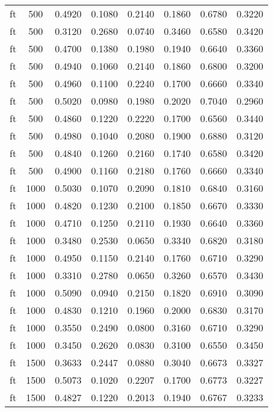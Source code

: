 \begin{scriptsize}
\begin{longtable}{cccccccc}
		ft       & 500  & 0.4920 & 0.1080 & 0.2140 & 0.1860 & 0.6780 & 0.3220 \\
		ft       & 500  & 0.3120 & 0.2680 & 0.0740 & 0.3460 & 0.6580 & 0.3420 \\
		ft       & 500  & 0.4700 & 0.1380 & 0.1980 & 0.1940 & 0.6640 & 0.3360 \\
		ft       & 500  & 0.4940 & 0.1060 & 0.2140 & 0.1860 & 0.6800 & 0.3200 \\
		ft       & 500  & 0.4960 & 0.1100 & 0.2240 & 0.1700 & 0.6660 & 0.3340 \\
		ft       & 500  & 0.5020 & 0.0980 & 0.1980 & 0.2020 & 0.7040 & 0.2960 \\
		ft       & 500  & 0.4860 & 0.1220 & 0.2220 & 0.1700 & 0.6560 & 0.3440 \\
		ft       & 500  & 0.4980 & 0.1040 & 0.2080 & 0.1900 & 0.6880 & 0.3120 \\
		ft       & 500  & 0.4840 & 0.1260 & 0.2160 & 0.1740 & 0.6580 & 0.3420 \\
		ft       & 500  & 0.4900 & 0.1160 & 0.2180 & 0.1760 & 0.6660 & 0.3340 \\
		ft       & 1000 & 0.5030 & 0.1070 & 0.2090 & 0.1810 & 0.6840 & 0.3160 \\
		ft       & 1000 & 0.4820 & 0.1230 & 0.2100 & 0.1850 & 0.6670 & 0.3330 \\
		ft       & 1000 & 0.4710 & 0.1250 & 0.2110 & 0.1930 & 0.6640 & 0.3360 \\
		ft       & 1000 & 0.3480 & 0.2530 & 0.0650 & 0.3340 & 0.6820 & 0.3180 \\
		ft       & 1000 & 0.4950 & 0.1150 & 0.2140 & 0.1760 & 0.6710 & 0.3290 \\
		ft       & 1000 & 0.3310 & 0.2780 & 0.0650 & 0.3260 & 0.6570 & 0.3430 \\
		ft       & 1000 & 0.5090 & 0.0940 & 0.2150 & 0.1820 & 0.6910 & 0.3090 \\
		ft       & 1000 & 0.4830 & 0.1210 & 0.1960 & 0.2000 & 0.6830 & 0.3170 \\
		ft       & 1000 & 0.3550 & 0.2490 & 0.0800 & 0.3160 & 0.6710 & 0.3290 \\
		ft       & 1000 & 0.3450 & 0.2620 & 0.0830 & 0.3100 & 0.6550 & 0.3450 \\
		ft       & 1500 & 0.3633 & 0.2447 & 0.0880 & 0.3040 & 0.6673 & 0.3327 \\
		ft       & 1500 & 0.5073 & 0.1020 & 0.2207 & 0.1700 & 0.6773 & 0.3227 \\
		ft       & 1500 & 0.4827 & 0.1220 & 0.2013 & 0.1940 & 0.6767 & 0.3233 \\

\end{longtable}
\end{scriptsize}
